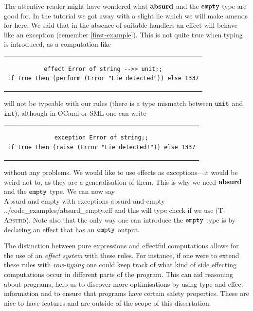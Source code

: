 \documentclass[class=article, crop=false]{standalone}
\begin{document}
The attentive reader might have wondered what $\mathbf{absurd}\ $and the $\mathtt{empty}$
type are good for. In the tutorial we got away with a slight lie which we will
make amends for here. We said that in the absence of suitable handlers an effect
will behave like an exception (remember \autoref{first-example}). This is
not quite true when typing is introduced, as a computation like
%
\begin{center}
\begin{tabular}{c}
{\begin{lstlisting}[language=efflang, numbers=none, frame=none]
effect Error of string -->> unit;;
if true then (perform (Error "Lie detected")) else 1337
\end{lstlisting}}
\end{tabular}
\end{center}
%
will not be typeable with our rules (there is a type mismatch between $\mathtt{unit}$
and $\mathtt{int}$), although in OCaml or SML one can write
%
\begin{center}
\begin{tabular}{c}
{\begin{lstlisting}[language=caml, numbers=none, frame=none]
exception Error of string;;
if true then (raise (Error "Lie detected!")) else 1337
\end{lstlisting}}
\end{tabular}
\end{center}
%
without any problems. We would like to use effects as exceptions---it would be
weird not to, as they are a generalisation of them. This is why we need
$\mathbf{absurd}\ $and the $\mathtt{empty}$ type. We can now say
\\
{Absurd and empty with exceptions}
{absurd-and-empty}
{../code_examples/absurd_empty.eff}
%
and this will type check if we use (\textsc{T-Absurd}). Note also that the only
way one can introduce the $\mathtt{empty}$ type is by declaring an effect that has
an $\mathtt{empty}$ output.

The distinction between pure expressions and effectful computations allows for
the use of an \emph{effect system} with these rules. For instance, if one were
to extend these rules with \emph{row-typing} one could keep track of what kind
of side effecting computations occur in different parts of the program. This can
aid reasoning about programs, help us to discover more optimisations by using
type and effect information and to ensure that programs have certain safety
properties. These are nice to have features and are outside of the scope of this
dissertation.
\end{document}
